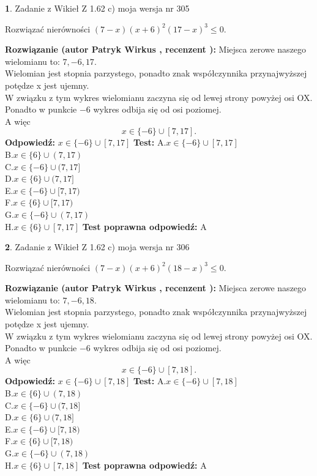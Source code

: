 \documentclass[12pt, a4paper]{article}
\theoremstyle{definition} %
\newtheorem{zad}{}
\newcommand{\zadStart}[1]{\begin{zad}#1\newline}
\newcommand{\zadStop}{\end{zad}}
\newcommand{\rozwStart}[2]{\noindent \textbf{Rozwiązanie (autor #1 , recenzent #2): }\newline}
\newcommand{\rozwStop}{\newline}
\newcommand{\odpStart}{\noindent \textbf{Odpowiedź:}\newline}
\newcommand{\odpStop}{\newline}
\newcommand{\testStart}{\noindent \textbf{Test:}\newline}
\newcommand{\testStop}{\newline}
\newcommand{\kluczStart}{\noindent \textbf{Test poprawna odpowiedź:}\newline}
\newcommand{\kluczStop}{\newline}
\begin{document}
\zadStart{Zadanie z Wikieł Z 1.62 c) moja wersja nr 305}

Rozwiązać nierówności $(7-x)(x+6)^{2}(17-x)^{3}\le0$.
\zadStop
\rozwStart{Patryk Wirkus}{}
Miejsca zerowe naszego wielomianu to: $7, -6, 17$.\\
Wielomian jest stopnia parzystego, ponadto znak współczynnika przy\linebreak najwyższej potędze x jest ujemny.\\ W związku z tym wykres wielomianu zaczyna się od lewej strony powyżej osi OX.\\
Ponadto w punkcie $-6$ wykres odbija się od osi poziomej.\\
A więc $$x \in \{-6\} \cup [7,17].$$
\rozwStop
\odpStart
$x \in \{-6\} \cup [7,17]$
\odpStop
\testStart
A.$x \in \{-6\} \cup [7,17]$\\
B.$x \in \{6\} \cup (7,17)$\\
C.$x \in \{-6\} \cup (7,17]$\\
D.$x \in \{6\} \cup (7,17]$\\
E.$x \in \{-6\} \cup [7,17)$\\
F.$x \in \{6\} \cup [7,17)$\\
G.$x \in \{-6\} \cup (7,17)$\\
H.$x \in \{6\} \cup [7,17]$
\testStop
\kluczStart
A
\kluczStop



\zadStart{Zadanie z Wikieł Z 1.62 c) moja wersja nr 306}

Rozwiązać nierówności $(7-x)(x+6)^{2}(18-x)^{3}\le0$.
\zadStop
\rozwStart{Patryk Wirkus}{}
Miejsca zerowe naszego wielomianu to: $7, -6, 18$.\\
Wielomian jest stopnia parzystego, ponadto znak współczynnika przy\linebreak najwyższej potędze x jest ujemny.\\ W związku z tym wykres wielomianu zaczyna się od lewej strony powyżej osi OX.\\
Ponadto w punkcie $-6$ wykres odbija się od osi poziomej.\\
A więc $$x \in \{-6\} \cup [7,18].$$
\rozwStop
\odpStart
$x \in \{-6\} \cup [7,18]$
\odpStop
\testStart
A.$x \in \{-6\} \cup [7,18]$\\
B.$x \in \{6\} \cup (7,18)$\\
C.$x \in \{-6\} \cup (7,18]$\\
D.$x \in \{6\} \cup (7,18]$\\
E.$x \in \{-6\} \cup [7,18)$\\
F.$x \in \{6\} \cup [7,18)$\\
G.$x \in \{-6\} \cup (7,18)$\\
H.$x \in \{6\} \cup [7,18]$
\testStop
\kluczStart
A
\kluczStop
\end{document}
